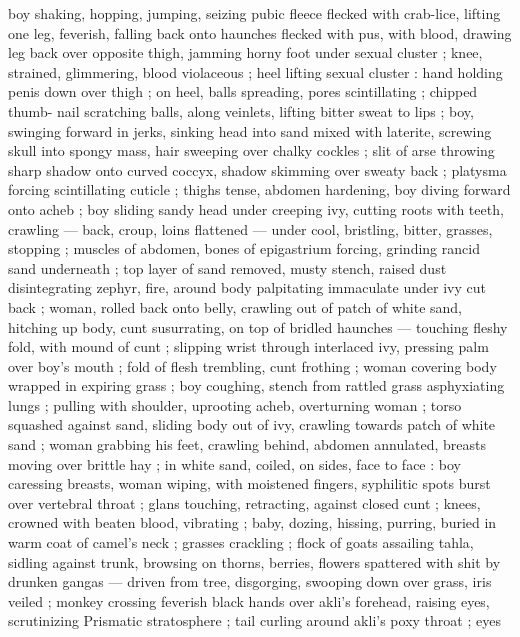 boy shaking, hopping, jumping, seizing pubic fleece flecked with 
crab-lice, lifting one leg, feverish, falling back onto haunches flecked 
with pus, with blood, drawing leg back over opposite thigh, jamming 
horny foot under sexual cluster ; knee, strained, glimmering, blood 
violaceous ; heel lifting sexual cluster : hand holding penis down over 
thigh ; on heel, balls spreading, pores scintillating ; chipped thumb- 
nail scratching balls, along veinlets, lifting bitter sweat to lips ; boy, 
swinging forward in jerks, sinking head into sand mixed with laterite, 
screwing skull into spongy mass, hair sweeping over chalky cockles 
; slit of arse throwing sharp shadow onto curved coccyx, shadow 
skimming over sweaty back ; platysma forcing scintillating cuticle ; 
thighs tense, abdomen hardening, boy diving forward onto acheb ; 
boy sliding sandy head under creeping ivy, cutting roots with teeth, 
crawling --- back, croup, loins flattened --- under cool, bristling, 
bitter, grasses, stopping ; muscles of abdomen, bones of 
epigastrium forcing, grinding rancid sand underneath ; top layer of 
sand removed, musty stench, raised dust disintegrating zephyr, fire, 
around body palpitating immaculate under ivy cut back ; woman, 
rolled back onto belly, crawling out of patch of white sand, hitching 
up body, cunt susurrating, on top of bridled haunches --- touching 
fleshy fold, with mound of cunt ; slipping wrist through interlaced ivy, 
pressing palm over boy's mouth ; fold of flesh trembling, cunt 
frothing ; woman covering body wrapped in expiring grass ; boy 
coughing, stench from rattled grass asphyxiating lungs ; pulling with 
shoulder, uprooting acheb, overturning woman ; torso squashed 
against sand, sliding body out of ivy, crawling towards patch of white 
sand ; woman grabbing his feet, crawling behind, abdomen 
annulated, breasts moving over brittle hay ; in white sand, coiled, on 
sides, face to face : boy caressing breasts, woman wiping, with 
moistened fingers, syphilitic spots burst over vertebral throat ; glans 
touching, retracting, against closed cunt ; knees, crowned with 
beaten blood, vibrating ; baby, dozing, hissing, purring, buried in 
warm coat of camel's neck ; grasses crackling ; flock of goats 
assailing tahla, sidling against trunk, browsing on thorns, berries, 
flowers spattered with shit by drunken gangas --- driven from tree, 
disgorging, swooping down over grass, iris veiled ; monkey crossing 
feverish black hands over akli's forehead, raising eyes, scrutinizing 
Prismatic stratosphere ; tail curling around akli's poxy throat ; eyes 
